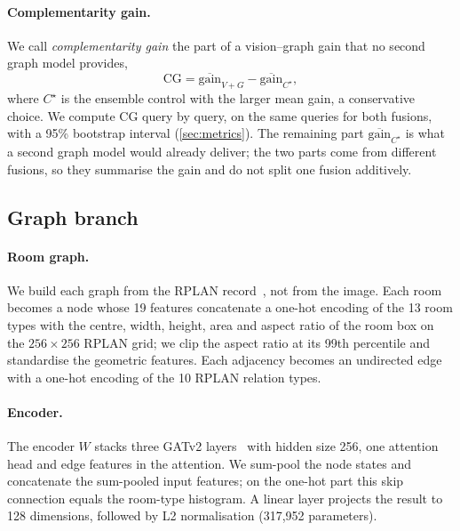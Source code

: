 \paragraph{Complementarity gain.}
We call \emph{complementarity gain} the part of a vision--graph gain that no second graph model provides,
\begin{equation}
  \mathrm{CG} = \overline{\mathrm{gain}}_{V+G} - \overline{\mathrm{gain}}_{C^\star},
  \label{eq:cg}
\end{equation}
where $C^\star$ is the ensemble control with the larger mean gain, a conservative choice.
We compute CG query by query, on the same queries for both fusions, with a 95\% bootstrap interval (\cref{sec:metrics}).
The remaining part $\overline{\mathrm{gain}}_{C^\star}$ is what a second graph model would already deliver; the two parts come from different fusions, so they summarise the gain and do not split one fusion additively.

\subsection{Graph branch}
\label{sec:method_graph}

\paragraph{Room graph.}
We build each graph from the RPLAN record~\cite{wu2019rplan}, not from the image.
Each room becomes a node whose 19 features concatenate a one-hot encoding of the 13 room types with the centre, width, height, area and aspect ratio of the room box on the $256\times256$ RPLAN grid; we clip the aspect ratio at its 99th percentile and standardise the geometric features.
Each adjacency becomes an undirected edge with a one-hot encoding of the 10 RPLAN relation types.

\paragraph{Encoder.}
The encoder $W$ stacks three GATv2 layers~\cite{brody2022gatv2} with hidden size 256, one attention head and edge features in the attention.
We sum-pool the node states and concatenate the sum-pooled input features; on the one-hot part this skip connection equals the room-type histogram.
A linear layer projects the result to 128 dimensions, followed by L2 normalisation (317{,}952 parameters).

